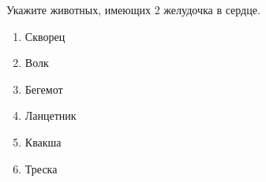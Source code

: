 Укажите животных, имеющих 2 желудочка в сердце.\\
\begin{enumerate}
    \item Скворец
    \item Волк
    \item Бегемот
    \item Ланцетник
    \item Квакша
    \item Треска
\end{enumerate}

